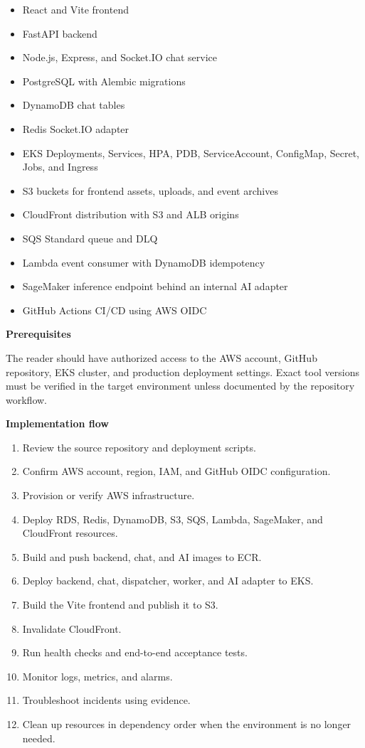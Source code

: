 \begin{itemize}
\tightlist
\item
  React and Vite frontend
\item
  FastAPI backend
\item
  Node.js, Express, and Socket.IO chat service
\item
  PostgreSQL with Alembic migrations
\item
  DynamoDB chat tables
\item
  Redis Socket.IO adapter
\item
  EKS Deployments, Services, HPA, PDB, ServiceAccount, ConfigMap,
  Secret, Jobs, and Ingress
\item
  S3 buckets for frontend assets, uploads, and event archives
\item
  CloudFront distribution with S3 and ALB origins
\item
  SQS Standard queue and DLQ
\item
  Lambda event consumer with DynamoDB idempotency
\item
  SageMaker inference endpoint behind an internal AI adapter
\item
  GitHub Actions CI/CD using AWS OIDC
\end{itemize}

\vspace{0.5em}\noindent\textbf{Prerequisites}\par

The reader should have authorized access to the AWS account, GitHub
repository, EKS cluster, and production deployment settings. Exact tool
versions must be verified in the target environment unless documented by
the repository workflow.

\vspace{0.5em}\noindent\textbf{Implementation flow}\par

\begin{enumerate}
\def\labelenumi{\arabic{enumi}.}
\tightlist
\item
  Review the source repository and deployment scripts.
\item
  Confirm AWS account, region, IAM, and GitHub OIDC configuration.
\item
  Provision or verify AWS infrastructure.
\item
  Deploy RDS, Redis, DynamoDB, S3, SQS, Lambda, SageMaker, and
  CloudFront resources.
\item
  Build and push backend, chat, and AI images to ECR.
\item
  Deploy backend, chat, dispatcher, worker, and AI adapter to EKS.
\item
  Build the Vite frontend and publish it to S3.
\item
  Invalidate CloudFront.
\item
  Run health checks and end-to-end acceptance tests.
\item
  Monitor logs, metrics, and alarms.
\item
  Troubleshoot incidents using evidence.
\item
  Clean up resources in dependency order when the environment is no
  longer needed.
\end{enumerate}

